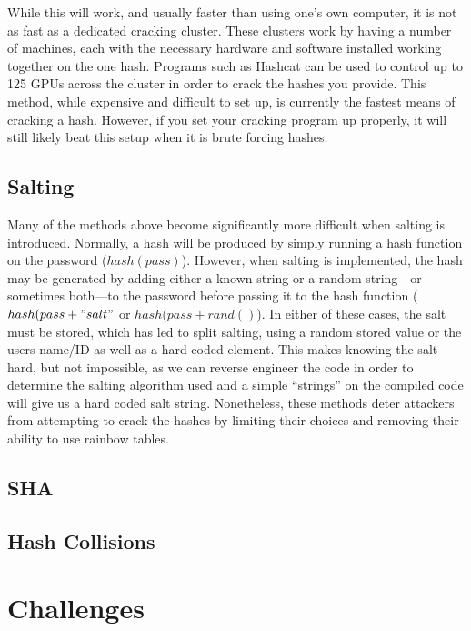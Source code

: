 \documentclass[a4paper,11pt]{report}
\begin{document}
			While this will work, and usually faster than using one's own computer, it is not as fast as a dedicated cracking cluster. 
			These clusters work by having a number of machines, each with the necessary hardware and software installed working together on the one hash. 
			Programs such as Hashcat can be used to control up to 125 GPUs across the cluster in order to crack the hashes you provide. 
			This method, while expensive and difficult to set up, is currently the fastest means of cracking a hash. 
			However, if you set your cracking program up properly, it will still likely beat this setup when it is brute forcing hashes. 
		\subsection{Salting}
			Many of the methods above become significantly more difficult when salting is introduced. 
			Normally, a hash will be produced by simply running a hash function on the password ($hash(pass)$). 
			However, when salting is implemented, the hash may be generated by adding either a known string or a random string---or sometimes both---to the password before passing it to the hash function ($hash(pass + "salt"$ or $hash(pass + rand()$).
			In either of these cases, the salt must be stored, which has led to split salting, using a random stored value or the users name/ID as well as a hard coded element. 
			This makes knowing the salt hard, but not impossible, as we can reverse engineer the code in order to determine the salting algorithm used and a simple ``strings'' on the compiled code will give us a hard coded salt string. 
			Nonetheless, these methods deter attackers from attempting to crack the hashes by limiting their choices and removing their ability to use rainbow tables. 
		\subsection{SHA}
		\subsection{Hash Collisions}
	\section{Challenges}
\end{document}
